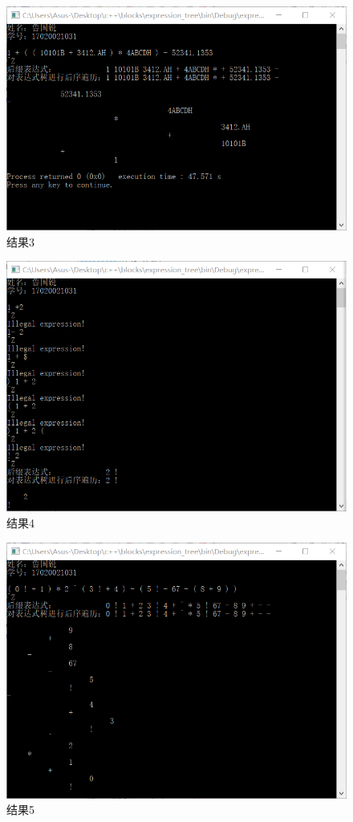 \documentclass[UTF8]{ctexart}
\begin{document}
\begin{figure}[H]
	\centering 
	\includegraphics[scale=0.8]{res4.png} 
	\caption{结果3} 
	\label{res3}
\end{figure}

\begin{figure}[H]
	\centering 
	\includegraphics[scale=0.8]{res5.png} 
	\caption{结果4} 
	\label{res4}
\end{figure}

\begin{figure}[H]
	\centering 
	\includegraphics[scale=0.8]{res2.png} 
	\caption{结果5} 
	\label{res5}
\end{figure}
\end{document}
